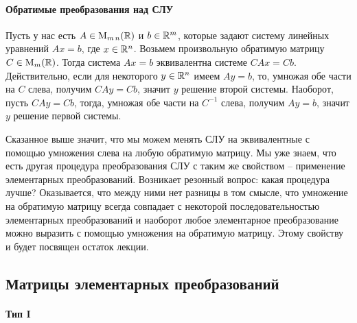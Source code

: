\paragraph{Обратимые преобразования над СЛУ} 


Пусть у нас есть $A\in\operatorname{M}_{m\,n}(\mathbb R)$ и $b\in \mathbb R^{m}$, которые задают систему линейных уравнений $Ax = b$, где $x\in \mathbb R^{n}$.
Возьмем произвольную обратимую матрицу $C\in\operatorname{M}_{m}(\mathbb R)$.
Тогда система $Ax = b$ эквивалентна системе $CAx = Cb$.
Действительно, если для некоторого $y\in\mathbb R^{n}$ имеем $Ay = b$, то, умножая обе части на $C$ слева, получим $CAy = Cb$, значит $y$ решение второй системы.
Наоборот, пусть $CA y = Cb$, тогда, умножая обе части на $C^{-1}$ слева, получим $Ay =b$, значит $y$ решение первой системы.

Сказанное выше значит, что мы можем менять СЛУ на эквивалентные с помощью умножения слева на любую обратимую матрицу.
Мы уже знаем, что есть другая процедура преобразования СЛУ с таким же свойством -- применение элементарных преобразований.
Возникает резонный вопрос: какая процедура лучше?
Оказывается, что между ними нет разницы в том смысле, что умножение на обратимую матрицу всегда совпадает с некоторой последовательностью элементарных преобразований и наоборот любое элементарное преобразование можно выразить с помощью умножения на обратимую матрицу.
Этому свойству и будет посвящен остаток лекции.

\subsection{Матрицы элементарных преобразований}
\label{section::ElemMat}

\paragraph{Тип I}

